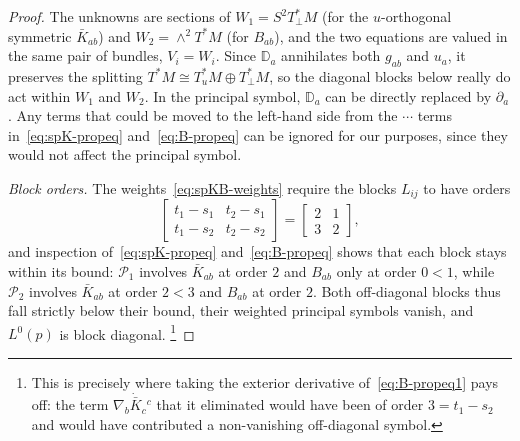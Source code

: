 \documentclass[a4paper]{article}
\theoremstyle{remark}
\newcommand{\del}{\partial}
\newcommand{\D}{\mathbb{D}}
\begin{document}
\begin{proof}
The unknowns are sections of $W_1 = S^2 T_\perp^* M$ (for the
$u$-orthogonal symmetric $\bar{K}_{ab}$) and $W_2 = \wedge^2 T^* M$
(for $B_{ab}$), and the two equations are valued in the same pair of
bundles, $V_i = W_i$. Since $\D_a$ annihilates both $g_{ab}$ and
$u_a$, it preserves the splitting $T^*M \cong T_u^*M \oplus
T_\perp^*M$, so the diagonal blocks below really do act within $W_1$
and $W_2$. In the principal symbol, $\D_a$ can be directly replaced by
$\del_a$. Any terms that could be moved to the left-hand side from the
$\cdots$ terms in~\eqref{eq:spK-propeq} and~\eqref{eq:B-propeq} can be
ignored for our purposes, since they would not affect the principal
symbol.

\emph{Block orders.} The weights~\eqref{eq:spKB-weights} require the
blocks $L_{ij}$ to have orders
\begin{equation}
	\begin{bmatrix} t_1-s_1 & t_2-s_1 \\ t_1-s_2 & t_2-s_2 \end{bmatrix}
	= \begin{bmatrix} 2 & 1 \\ 3 & 2 \end{bmatrix} ,
\end{equation}
and inspection of~\eqref{eq:spK-propeq} and~\eqref{eq:B-propeq} shows
that each block stays within its bound: $\mathcal{P}_1$ involves
$\bar{K}_{ab}$ at order $2$ and $B_{ab}$ only at order $0 < 1$, while
$\mathcal{P}_2$ involves $\bar{K}_{ab}$ at order $2 < 3$ and
$B_{ab}$ at order $2$. Both off-diagonal blocks thus fall strictly below
their bound, their weighted principal symbols vanish, and $L^0(p)$ is
block diagonal.%
	\footnote{This is precisely where taking the exterior derivative
	of~\eqref{eq:B-propeq1} pays off: the term $\nabla_b
	\dot{\bar{K}}_c{}^c$ that it eliminated would have been of order $3 =
	t_1 - s_2$ and would have contributed a non-vanishing off-diagonal
	symbol.}


\end{proof}
\end{document}
